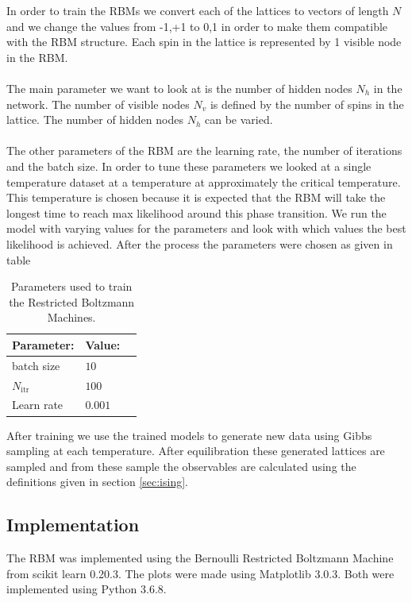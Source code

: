 \documentclass[10 pt, a4paper]{article}
\begin{document}
In order to train the RBMs we convert each of the lattices to vectors of length $N$ and we change the values from {-1,+1} to {0,1} in order to make them compatible with the RBM structure. Each spin in the lattice is represented by 1 visible node in the RBM.
\\
\\
The main parameter we want to look at is the number of hidden nodes $N_h$ in the network. The number of visible nodes $N_v$ is defined by the number of spins in the lattice. The number of hidden nodes $N_h$ can be varied. 
\\
\\
The other parameters of the RBM are the learning rate, the number of iterations and the batch size. In order to tune these parameters we looked at a single temperature dataset at a temperature at approximately the critical temperature. This temperature is chosen because it is expected that the RBM will take the longest time to reach max likelihood around this phase transition. We run the model with varying values for the parameters and look with which values the best likelihood is achieved. After the process the parameters were chosen as given in table 

\begin{table}[H] 
\centering
\caption{Parameters used to train the Restricted Boltzmann Machines.}
\begin{tabular}{l|ll}
Parameter: & Value: &  \\ 
\hline \hline
batch size     & $10$                    \\
$N_\mathrm{itr}$     & $100$                        \\
Learn rate    & $0.001$                        \\  
\end{tabular}
\label{tab:rbmpar}
\end{table}

After training we use the trained models to generate new data using Gibbs sampling at each temperature. After equilibration these generated lattices are sampled and from these sample the observables are calculated using the definitions given in section \ref{sec:ising}.

\subsection{Implementation}

The RBM was implemented using the Bernoulli Restricted Boltzmann Machine from scikit learn 0.20.3. The plots were made using Matplotlib 3.0.3. Both were implemented using Python 3.6.8.
\end{document}
